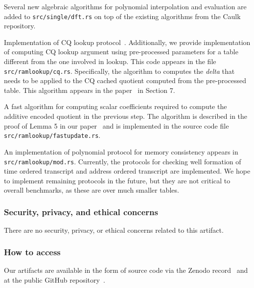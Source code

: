 \documentclass[sigconf]{acmart}
\begin{document}
	\begin{compactitem}
		\item Several new algebraic algorithms for polynomial interpolation and evaluation are added to {\tt src/single/dft.rs} on top of the existing algorithms from the Caulk repository.
		\item Implementation of CQ lookup protocol~\cite{EPRINT:EagFioGab22}. Additionally, we provide implementation of computing CQ lookup argument using pre-processed parameters for
		a table different from the one involved in lookup. This code appears in the file {\tt src/ramlookup/cq.rs}. Specifically, the algorithm to computes the {\em delta}
		that needs to be applied to the CQ cached quotient computed from the pre-processed table. This algorithm appears in the
		paper~\cite{full-ver} in Section 7.
		\item A fast algorithm for computing scalar coefficients required to compute the additive encoded quotient in the previous step. The algorithm
		is described in the proof of Lemma 5 in our paper~\cite{full-ver} and is implemented in the source code file {\tt src/ramlookup/fastupdate.rs}.
		\item An implementation of polynomial protocol for memory consistency appears in {\tt src/ramlookup/mod.rs}.
		Currently, the protocols for checking well formation of time ordered transcript and address ordered transcript are implemented.
		We hope to implement remaining protocols in the future, but they are not critical to overall benchmarks, as these are over much smaller tables.
	\end{compactitem}
	

	
	

	
	
	\subsubsection{Security, privacy, and ethical concerns}
	
	There are no security, privacy, or ethical concerns related to this artifact. 
	
	
	\subsubsection{How to access}
	Our artifacts are available in the form of source code via the Zenodo record~\cite{artifact-archive}
	and at the public GitHub repository~\cite{github-archive}.
	
\end{document}
